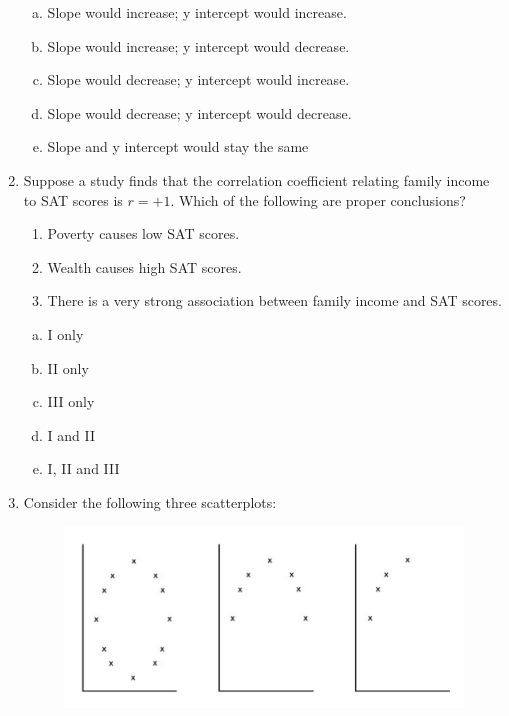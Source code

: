 \documentclass[a4paper,12pt,twoside]{book}
\begin{document}
\begin{enumerate}
        \begin{enumerate}[(a)]
            \item Slope would increase; y intercept would increase.
            \item Slope would increase; y intercept would decrease.
            \item Slope would decrease; y intercept would increase.
            \item Slope would decrease; y intercept would decrease.
            \item Slope and y intercept would stay the same
        \end{enumerate}
        \vspace{0.3cm}
        
    \item Suppose a study finds that the correlation coefficient relating family income to SAT scores is $r = +1$. Which of the following are proper conclusions?
         \begin{enumerate}[\Roman*. , start = 1]
             \item Poverty causes low SAT scores.
             \item Wealth causes high SAT scores.
             \item There is a very strong association between family income and SAT scores.
         \end{enumerate}
        
        \begin{multicols}{3}
        \begin{enumerate}[(a)]
            \item I only
            \item II only
            \item III only
            \item I and II
            \item I, II and III
        \end{enumerate}
        \end{multicols}
        \vspace{0.3cm}
        
    \item Consider the following three scatterplots:
        \begin{figure}[H]
            \centering
            \includegraphics[scale=0.6]{figure0208}
        \end{figure}
        

\end{enumerate}
\end{document}
